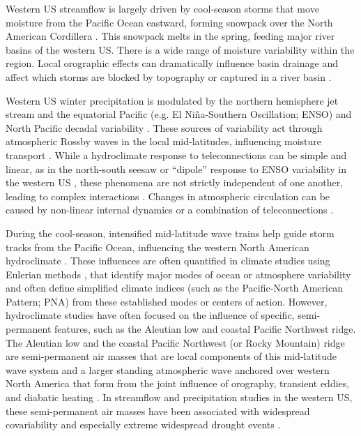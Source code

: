 \documentclass[final, double]{ua-thesis}
\begin{document}
Western US streamflow is largely driven by cool-season storms that move moisture from the Pacific Ocean eastward, forming snowpack over the North American Cordillera \citep{rasmusson_atmospheric_1967, klein_specification_1987, hsu_global_1976}. This snowpack melts in the spring, feeding major river basins of the western US. There is a wide range of moisture variability within the region. Local orographic effects can dramatically influence basin drainage and affect which storms are blocked by topography or captured in a river basin \citep[e.g., ][]{changnon_hydroclimatic_1991}.

Western US winter precipitation is modulated by the northern hemisphere jet stream and the equatorial Pacific (e.g. El Ni\~{n}a-Southern Oscillation; ENSO) and North Pacific decadal variability \citep{redmond_surface_1991, dettinger_northsouth_1998, cayan_enso_1999, wise_spatiotemporal_2010}. These sources of variability act through atmospheric Rossby waves in the local mid-latitudes, influencing moisture transport \citep{bjerknes_atmospheric_1969, horel_planetary-scale_1981}. While a hydroclimate response to teleconnections can be simple and linear, as in the north-south seesaw or ``dipole'' response to ENSO variability in the western US \citep{brown_winter_2004}, these phenomena are not strictly independent of one another, leading to complex interactions \citep{frankignoul_stochastic_1977, alexander_surface_1997, newman_enso-forced_2003}. Changes in atmospheric circulation can be caused by non-linear internal dynamics or a combination of teleconnections \citep{feldstein_timescale_2000}. 

During the cool-season, intensified mid-latitude wave trains help guide storm tracks from the Pacific Ocean, influencing the western North American hydroclimate \citep{yarnal_relationships_1986, leathers_pacific/north_1991, redmond_surface_1991}. These influences are often quantified in climate studies using Eulerian methods \citep[e.g., ][]{wallace_teleconnections_1981}, that identify major modes of ocean or atmosphere variability and often define simplified climate indices (such as the Pacific-North American Pattern; PNA) from these established modes or centers of action. However, hydroclimate studies have often focused on the influence of specific, semi-permanent features, such as the Aleutian low and coastal Pacific Northwest ridge. The Aleutian low and the coastal Pacific Northwest (or Rocky Mountain) ridge are semi-permanent air masses that are local components of this mid-latitude wave system and a larger standing atmospheric wave anchored over western North America that form from the joint influence of orography, transient eddies, and diabatic heating \citep{charney_numerical_1949, hoskins_steady_1981}. In streamflow and precipitation studies in the western US, these semi-permanent air masses have been associated with widespread covariability and especially extreme widespread drought events \citep{mcguirk_century_1982, cayan_influence_1989, cook_worst_2014, seager_causes_2014, wise_five_2016}.
\end{document}
